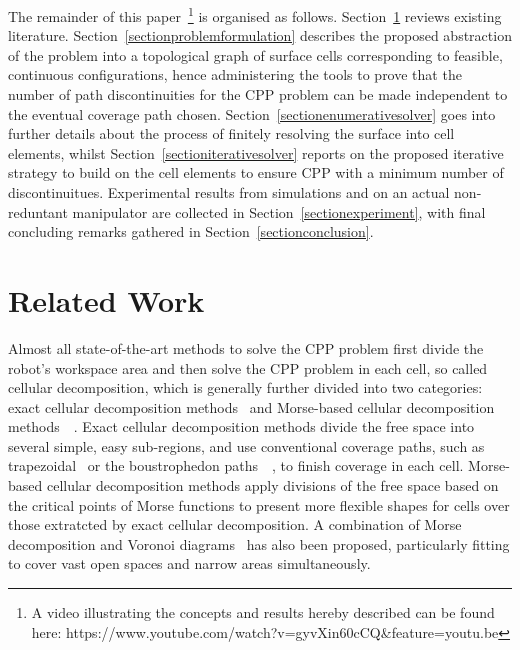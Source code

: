 \documentclass[journal]{IEEEtran}
\begin{document}
The remainder of this paper~\footnote{A video illustrating the concepts and results hereby described can be found here: https://www.youtube.com/watch?v=gyvXin60cCQ\&feature=youtu.be} 
is organised as follows. Section~\ref{sectionrelatedwork} reviews existing literature. 
Section~\ref{sectionproblemformulation} describes the proposed abstraction of the problem into a topological graph of surface cells corresponding 
to feasible, continuous configurations, hence administering the tools to prove that the number of path discontinuities for the CPP problem can be made independent to the eventual coverage path chosen. %
Section~\ref{sectionenumerativesolver} goes into further details about the process of finitely resolving the surface into cell elements, whilst 
Section~\ref{sectioniterativesolver} reports on the proposed iterative strategy to build on the cell elements to ensure CPP with a minimum number of discontinuitues. Experimental results from simulations and on an actual non-reduntant manipulator are collected in Section~\ref{sectionexperiment}, with final concluding remarks gathered in Section~\ref{sectionconclusion}. 


\section{Related Work}\label{sectionrelatedwork}
Almost all state-of-the-art methods to solve the CPP problem first divide the robot's workspace area and then solve the CPP problem in each cell, so called cellular decomposition, which is generally further divided into two categories: exact cellular decomposition methods~\cite{lumelsky1990dynamic} and Morse-based cellular decomposition methods~\cite{choset2000exact}~\cite{Acar2002Morse}. 
Exact cellular decomposition methods divide the free space into several simple, easy sub-regions, and use conventional coverage paths, such as trapezoidal~\cite{choset2005principles} or the boustrophedon paths~\cite{choset1998coverage}~\cite{choset2000coverage}, to finish coverage in each cell. 
Morse-based cellular decomposition methods apply divisions of the free space based on the critical points of Morse functions to present more flexible shapes for cells over those extratcted by exact cellular decomposition. 
A combination of Morse decomposition and Voronoi diagrams~\cite{choset2000sensor-based} has also been proposed, particularly fitting to 
cover vast open spaces and narrow areas simultaneously.
\end{document}
